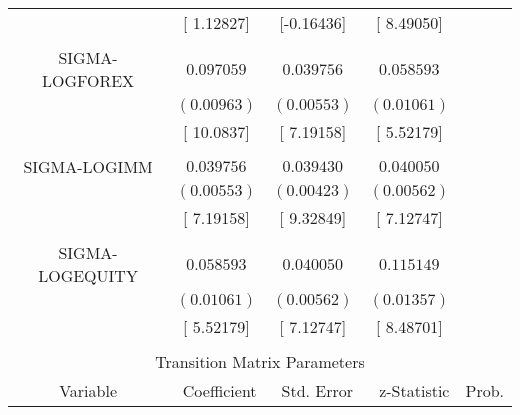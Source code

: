 \begin{tabular}{lrrrr}
\multicolumn{1}{c}{}&\multicolumn{1}{c}{[ 1.12827]}&\multicolumn{1}{c}{[-0.16436]}&\multicolumn{1}{c}{[ 8.49050]}&\multicolumn{1}{c}{}\\
\multicolumn{1}{c}{}&\multicolumn{1}{c}{}&\multicolumn{1}{c}{}&\multicolumn{1}{c}{}&\multicolumn{1}{c}{}\\
\multicolumn{1}{c}{SIGMA-LOGFOREX}&\multicolumn{1}{c}{$0.097059$}&\multicolumn{1}{c}{$0.039756$}&\multicolumn{1}{c}{$0.058593$}&\multicolumn{1}{c}{}\\
\multicolumn{1}{c}{}&\multicolumn{1}{c}{$(0.00963)$}&\multicolumn{1}{c}{$(0.00553)$}&\multicolumn{1}{c}{$(0.01061)$}&\multicolumn{1}{c}{}\\
\multicolumn{1}{c}{}&\multicolumn{1}{c}{[ 10.0837]}&\multicolumn{1}{c}{[ 7.19158]}&\multicolumn{1}{c}{[ 5.52179]}&\multicolumn{1}{c}{}\\
\multicolumn{1}{c}{}&\multicolumn{1}{c}{}&\multicolumn{1}{c}{}&\multicolumn{1}{c}{}&\multicolumn{1}{c}{}\\
\multicolumn{1}{c}{SIGMA-LOGIMM}&\multicolumn{1}{c}{$0.039756$}&\multicolumn{1}{c}{$0.039430$}&\multicolumn{1}{c}{$0.040050$}&\multicolumn{1}{c}{}\\
\multicolumn{1}{c}{}&\multicolumn{1}{c}{$(0.00553)$}&\multicolumn{1}{c}{$(0.00423)$}&\multicolumn{1}{c}{$(0.00562)$}&\multicolumn{1}{c}{}\\
\multicolumn{1}{c}{}&\multicolumn{1}{c}{[ 7.19158]}&\multicolumn{1}{c}{[ 9.32849]}&\multicolumn{1}{c}{[ 7.12747]}&\multicolumn{1}{c}{}\\
\multicolumn{1}{c}{}&\multicolumn{1}{c}{}&\multicolumn{1}{c}{}&\multicolumn{1}{c}{}&\multicolumn{1}{c}{}\\
\multicolumn{1}{c}{SIGMA-LOGEQUITY}&\multicolumn{1}{c}{$0.058593$}&\multicolumn{1}{c}{$0.040050$}&\multicolumn{1}{c}{$0.115149$}&\multicolumn{1}{c}{}\\
\multicolumn{1}{c}{}&\multicolumn{1}{c}{$(0.01061)$}&\multicolumn{1}{c}{$(0.00562)$}&\multicolumn{1}{c}{$(0.01357)$}&\multicolumn{1}{c}{}\\
\multicolumn{1}{c}{}&\multicolumn{1}{c}{[ 5.52179]}&\multicolumn{1}{c}{[ 7.12747]}&\multicolumn{1}{c}{[ 8.48701]}&\multicolumn{1}{c}{}\\
[4.5pt] \hline \\ [-4.5pt]
\multicolumn{5}{c}{Transition Matrix Parameters}\\
\multicolumn{1}{c}{Variable}&\multicolumn{1}{r}{Coefficient}&\multicolumn{1}{r}{Std. Error}&\multicolumn{1}{r}{z-Statistic}&\multicolumn{1}{c}{Prob.}\\

\end{tabular}
